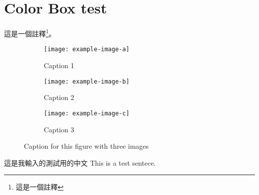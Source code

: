 \documentclass[12pt, oneside]{book}
\begin{document}
\section{Color Box test}
\thm{}{}
這是一個註釋\footnote{這是一個註釋}。

\begin{figure}[H]
	\centering
	\begin{subfigure}{0.3\textwidth}
		\centering
		\texttt{[image: example-image-a]}
		\caption{Caption 1}
		\label{fig:sub1}
	\end{subfigure}
	\begin{subfigure}{0.3\textwidth}
		\centering
		\texttt{[image: example-image-b]}
		\caption{Caption 2}
		\label{fig:sub2}
	\end{subfigure}
	\begin{subfigure}{0.3\textwidth}
		\centering
		\texttt{[image: example-image-c]}
		\caption{Caption 3}
		\label{fig:sub3}
	\end{subfigure}
	\caption{Caption for this figure with three images}
	\label{fig:image3}
\end{figure}

這是我輸入的測試用的中文
This is a test sentece.



\nocite{*}


\end{document}

